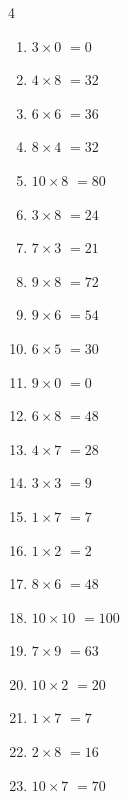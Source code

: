 \begin{multicols}{4}
\begin{enumerate}
  \item $3\times 0$
        $=0$

  \item $4\times 8$
        $=32$

  \item $6\times 6$
        $=36$

  \item $8\times 4$
        $=32$

  \item $10\times 8$
        $=80$

  \item $3\times 8$
        $=24$

  \item $7\times 3$
        $=21$

  \item $9\times 8$
        $=72$

  \item $9\times 6$
        $=54$

  \item $6\times 5$
        $=30$

  \item $9\times 0$
        $=0$

  \item $6\times 8$
        $=48$

  \item $4\times 7$
        $=28$

  \item $3\times 3$
        $=9$

  \item $1\times 7$
        $=7$

  \item $1\times 2$
        $=2$

  \item $8\times 6$
        $=48$

  \item $10\times 10$
        $=100$

  \item $7\times 9$
        $=63$

  \item $10\times 2$
        $=20$

  \item $1\times 7$
        $=7$

  \item $2\times 8$
        $=16$

\columnbreak %

  \item $10\times 7$
        $=70$


\end{enumerate}
\end{multicols}
